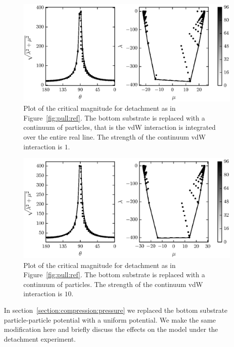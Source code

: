    \begin{figure}[t!]
      \begin{center}
         \includegraphics{./fig/ch3/pull/p1/grid.eps}
      \end{center}      
      \caption{Plot of the critical magnitude for detachment as in Figure~\ref{fig:pull:ref}. The bottom substrate is replaced with a continuum of particles, that is the vdW interaction is integrated over the entire real line. The strength of the continuum vdW interaction is $1$.
      \label{fig:pull:p1}}
   \end{figure}
   
   \begin{figure}[t]
      \begin{center}
         \includegraphics{./fig/ch3/pull/p10/grid.eps}
      \end{center}      
      \caption{Plot of the critical magnitude for detachment as in Figure~\ref{fig:pull:ref}. The bottom substrate is replaced with a continuum of particles. The strength of the continuum vdW interaction is $10$.
      \label{fig:pull:p10}}
   \end{figure}

In section~\ref{section:compression:pressure} we replaced the bottom substrate particle-particle potential with a uniform potential. We make the same modification here and briefly discuss the effects on the model under the detachment experiment.

